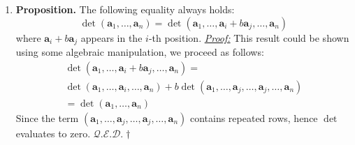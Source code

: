 \documentclass[oneside, 12pt]{book}
\newcommand{\settag}[1]{\renewcommand{\theenumi}{#1}}
\newcommand{\qed}{\hfill $\mathcal{Q}.\mathcal{E}.\mathcal{D}.\dagger$}
\newcommand{\tbf}[1]{\textbf{#1}}
\newcommand{\tit}[1]{\textit{#1}}
\newcommand{\proof}{\tit{\underline{Proof:}}} %
\newcommand{\para}[1]{\item \tbf{#1}}
\newcommand{\va}{\mathbf{a}}
\begin{document}
\begin{enumerate}
    \settag{3.2.11}
    \para{Proposition.} The following equality always holds:
    \begin{equation*}
        \det(\va_1,\ldots,\va_n) = \det(\va_1,\ldots,\va_i + b\va_j,\ldots,\va_n)
    \end{equation*}
    where $\va_i + b\va_j$ appears in the $i$-th position. \newline
    \proof \newline
    This result could be shown using some algebraic manipulation, we proceed as follows:
    \begin{multline*}
        \det(\va_1,\ldots,\va_i + b\va_j,\ldots,\va_n) = \\ \det(\va_1,\ldots,\va_i,\ldots,\va_n) +  b\det(\va_1,\ldots,\va_j,\ldots,\va_j,\ldots,\va_n) \\ 
        = \det(\va_1,\ldots,\va_n)
    \end{multline*}
    Since the term $(\va_1,\ldots,\va_j,\ldots,\va_j,\ldots,\va_n)$ contains repeated rows, hence $\det$ evaluates to zero. \qed
    

\end{enumerate}
\end{document}
